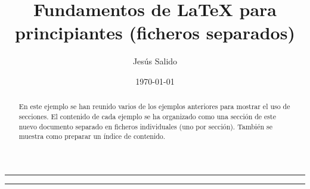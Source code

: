 \documentclass[11pt,a4paper]{article}
\author{Jesús Salido}
\title{Fundamentos de \LaTeX{} para principiantes (ficheros separados)}
\date{\today}
\begin{document}
\maketitle

\begin{abstract}
	En este ejemplo se han reunido varios de los ejemplos anteriores para mostrar el uso de secciones. El contenido de cada ejemplo se ha organizado como una sección de este nuevo documento separado en ficheros individuales (uno por sección). También se muestra como preparar un índice de contenido.
\end{abstract}


\hrule %
\tableofcontents %
\vspace{0.5cm} %
\hrule







%
%
%
%
\end{document}
